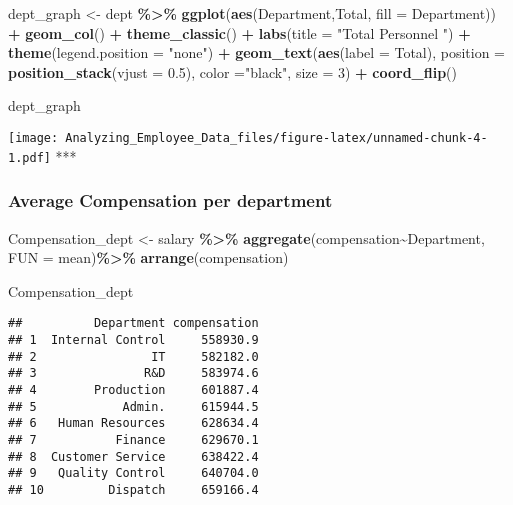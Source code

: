 \documentclass[
]{article}
\newenvironment{Shaded}{\begin{snugshade}}{\end{snugshade}}
\newcommand{\AttributeTok}[1]{\textcolor[rgb]{0.13,0.29,0.53}{#1}}
\newcommand{\DecValTok}[1]{\textcolor[rgb]{0.00,0.00,0.81}{#1}}
\newcommand{\FloatTok}[1]{\textcolor[rgb]{0.00,0.00,0.81}{#1}}
\newcommand{\FunctionTok}[1]{\textcolor[rgb]{0.13,0.29,0.53}{\textbf{#1}}}
\newcommand{\NormalTok}[1]{#1}
\newcommand{\OtherTok}[1]{\textcolor[rgb]{0.56,0.35,0.01}{#1}}
\newcommand{\SpecialCharTok}[1]{\textcolor[rgb]{0.81,0.36,0.00}{\textbf{#1}}}
\newcommand{\StringTok}[1]{\textcolor[rgb]{0.31,0.60,0.02}{#1}}
\begin{document}
\begin{Shaded}
\begin{Highlighting}[]
\NormalTok{dept\_graph }\OtherTok{\textless{}{-}}\NormalTok{ dept }\SpecialCharTok{\%\textgreater{}\%} \FunctionTok{ggplot}\NormalTok{(}\FunctionTok{aes}\NormalTok{(Department,Total, }\AttributeTok{fill =}\NormalTok{ Department)) }\SpecialCharTok{+} \FunctionTok{geom\_col}\NormalTok{() }\SpecialCharTok{+} 
  \FunctionTok{theme\_classic}\NormalTok{() }\SpecialCharTok{+} 
  \FunctionTok{labs}\NormalTok{(}\AttributeTok{title =} \StringTok{"Total Personnel "}\NormalTok{) }\SpecialCharTok{+} 
  \FunctionTok{theme}\NormalTok{(}\AttributeTok{legend.position =} \StringTok{"none"}\NormalTok{) }\SpecialCharTok{+} 
  \FunctionTok{geom\_text}\NormalTok{(}\FunctionTok{aes}\NormalTok{(}\AttributeTok{label =}\NormalTok{ Total), }
            \AttributeTok{position =} \FunctionTok{position\_stack}\NormalTok{(}\AttributeTok{vjust =} \FloatTok{0.5}\NormalTok{),}
            \AttributeTok{color =}\StringTok{"black"}\NormalTok{, }\AttributeTok{size =} \DecValTok{3}\NormalTok{) }\SpecialCharTok{+} \FunctionTok{coord\_flip}\NormalTok{()}

\NormalTok{dept\_graph}
\end{Highlighting}
\end{Shaded}

\texttt{[image: Analyzing\_Employee\_Data\_files/figure-latex/unnamed-chunk-4-1.pdf]}
***

\subsubsection{Average Compensation per
department}\label{average-compensation-per-department}

\begin{Shaded}
\begin{Highlighting}[]
\NormalTok{Compensation\_dept }\OtherTok{\textless{}{-}}\NormalTok{ salary }\SpecialCharTok{\%\textgreater{}\%} \FunctionTok{aggregate}\NormalTok{(compensation}\SpecialCharTok{\textasciitilde{}}\NormalTok{Department, }\AttributeTok{FUN =}\NormalTok{ mean)}\SpecialCharTok{\%\textgreater{}\%} \FunctionTok{arrange}\NormalTok{(compensation) }

\NormalTok{Compensation\_dept}
\end{Highlighting}
\end{Shaded}

\begin{verbatim}
##          Department compensation
## 1  Internal Control     558930.9
## 2                IT     582182.0
## 3               R&D     583974.6
## 4        Production     601887.4
## 5            Admin.     615944.5
## 6   Human Resources     628634.4
## 7           Finance     629670.1
## 8  Customer Service     638422.4
## 9   Quality Control     640704.0
## 10         Dispatch     659166.4
\end{verbatim}
\end{document}

